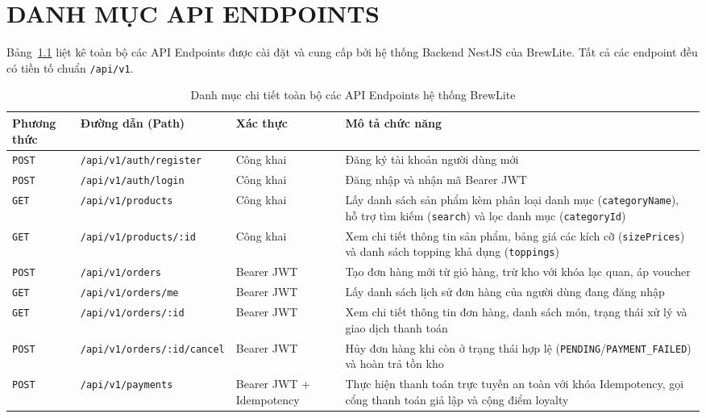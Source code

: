 \chapter{DANH MỤC API ENDPOINTS}
\label{app:api-endpoints}

Bảng~\ref{tab:full-api-list} liệt kê toàn bộ các API Endpoints được cài đặt và cung cấp bởi hệ thống Backend NestJS của BrewLite. Tất cả các endpoint đều có tiền tố chuẩn \texttt{/api/v1}.

\begin{table}[htbp]
\centering
\small
\caption{Danh mục chi tiết toàn bộ các API Endpoints hệ thống BrewLite}
\label{tab:full-api-list}
\begin{tabularx}{\textwidth}{llp{2.5cm}X}
\toprule
\textbf{Phương thức} & \textbf{Đường dẫn (Path)} & \textbf{Xác thực} & \textbf{Mô tả chức năng} \\
\midrule
\texttt{POST} & \texttt{/api/v1/auth/register} & Công khai & Đăng ký tài khoản người dùng mới \\
\texttt{POST} & \texttt{/api/v1/auth/login} & Công khai & Đăng nhập và nhận mã Bearer JWT \\
\midrule
\texttt{GET} & \texttt{/api/v1/products} & Công khai & Lấy danh sách sản phẩm kèm phân loại danh mục (\texttt{categoryName}), hỗ trợ tìm kiếm (\texttt{search}) và lọc danh mục (\texttt{categoryId}) \\
\texttt{GET} & \texttt{/api/v1/products/:id} & Công khai & Xem chi tiết thông tin sản phẩm, bảng giá các kích cỡ (\texttt{sizePrices}) và danh sách topping khả dụng (\texttt{toppings}) \\
\midrule
\texttt{POST} & \texttt{/api/v1/orders} & Bearer JWT & Tạo đơn hàng mới từ giỏ hàng, trừ kho với khóa lạc quan, áp voucher \\
\texttt{GET} & \texttt{/api/v1/orders/me} & Bearer JWT & Lấy danh sách lịch sử đơn hàng của người dùng đang đăng nhập \\
\texttt{GET} & \texttt{/api/v1/orders/:id} & Bearer JWT & Xem chi tiết thông tin đơn hàng, danh sách món, trạng thái xử lý và giao dịch thanh toán \\
\texttt{POST} & \texttt{/api/v1/orders/:id/cancel} & Bearer JWT & Hủy đơn hàng khi còn ở trạng thái hợp lệ (\texttt{PENDING}/\texttt{PAYMENT\_FAILED}) và hoàn trả tồn kho \\
\midrule
\texttt{POST} & \texttt{/api/v1/payments} & Bearer JWT + Idempotency & Thực hiện thanh toán trực tuyến an toàn với khóa Idempotency, gọi cổng thanh toán giả lập và cộng điểm loyalty \\
\bottomrule
\end{tabularx}
\end{table}

